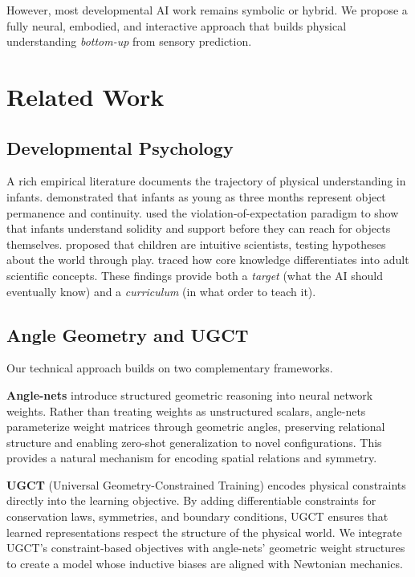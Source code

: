 \documentclass[11pt,oneside]{article}
\begin{document}
However, most developmental AI work remains symbolic or hybrid. We propose a fully neural, embodied, and interactive approach that builds physical understanding \emph{bottom-up} from sensory prediction.

\section{Related Work}

\subsection{Developmental Psychology}

A rich empirical literature documents the trajectory of physical understanding in infants. \citet{spelke1995spatial} demonstrated that infants as young as three months represent object permanence and continuity. \citet{ Baillargeon1994 } used the violation-of-expectation paradigm to show that infants understand solidity and support before they can reach for objects themselves. \citet{gopnik2012scientist} proposed that children are intuitive scientists, testing hypotheses about the world through play. \citet{carey2009origin} traced how core knowledge differentiates into adult scientific concepts. These findings provide both a \emph{target} (what the AI should eventually know) and a \emph{curriculum} (in what order to teach it).

\subsection{Angle Geometry and UGCT}

Our technical approach builds on two complementary frameworks.

\textbf{Angle-nets} \citep{anglenets2023} introduce structured geometric reasoning into neural network weights. Rather than treating weights as unstructured scalars, angle-nets parameterize weight matrices through geometric angles, preserving relational structure and enabling zero-shot generalization to novel configurations. This provides a natural mechanism for encoding spatial relations and symmetry.

\textbf{UGCT} \citep{ugct2023} (Universal Geometry-Constrained Training) encodes physical constraints directly into the learning objective. By adding differentiable constraints for conservation laws, symmetries, and boundary conditions, UGCT ensures that learned representations respect the structure of the physical world. We integrate UGCT's constraint-based objectives with angle-nets' geometric weight structures to create a model whose inductive biases are aligned with Newtonian mechanics.
\end{document}
